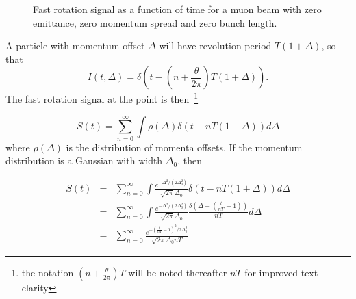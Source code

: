 \begin{figure}[bt]
\centering
{}
\caption{Fast rotation signal as a function of time for a muon beam with zero emittance, zero momentum spread and zero bunch length.}
\label{fig:perfect_frs}
\end{figure}
 
A particle with momentum offset $\Delta$ will have revolution period $T(1+\Delta)$, so that 
\begin{equation}
I(t,\Delta)=\delta\left(t-\left(n+\frac{\theta}{2\pi}\right)T\left(1+\Delta\right)\right). 
\end{equation}
The fast rotation signal at the point is then~\footnote{the notation $(n+\frac{\theta}{2\pi})T$ will be noted thereafter $nT$ for improved text clarity} 

\begin{equation}
S(t)=\sum^{\infty}_{n=0}\int\rho(\Delta)\delta\left(t-nT\left(1+\Delta\right)\right)d\Delta 
\end{equation}
where $\rho(\Delta)$ is the distribution of momenta offsets. If the momentum distribution is a Gaussian with width $\Delta_0$, then 

\begin{eqnarray}
S(t) &=& \sum^{\infty}_{n=0}\int\frac{e^{-\Delta^2/(2\Delta^2_0)}}{\sqrt{2\pi}\Delta_0}
\delta\left(t-nT\left(1+\Delta\right)\right)d\Delta\\
&=&\sum^{\infty}_{n=0}\int\frac{e^{-\Delta^2/(2\Delta^2_0)}}{\sqrt{2\pi}\Delta_0}\frac{\delta\left(\Delta-\left(\frac{t}{nT}-1\right)\right)}{nT}d\Delta\\
&=&\sum^{\infty}_{n=0}\frac{e^{-(\frac{t}{nT}-1)^2/2\Delta^2_0}}{\sqrt{2\pi}\Delta_0nT}\label{eq:Espread_frs}
\end{eqnarray}

